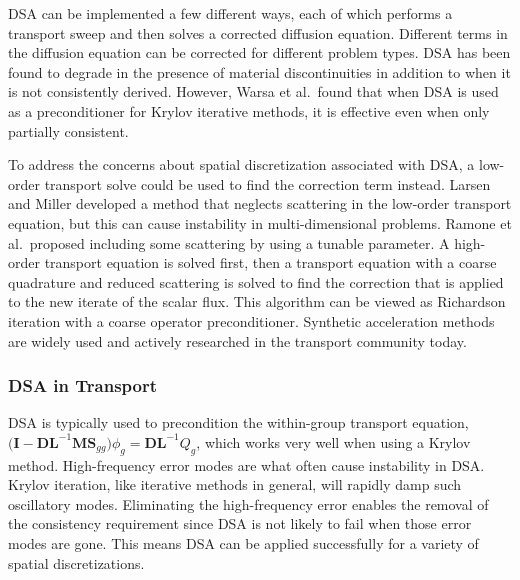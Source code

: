 \documentclass[12pt]{article}
\newcommand{\ve}[1]{\ensuremath{\mathbf{#1}}}
\begin{document}
DSA can be implemented a few different ways, each of which performs a transport sweep and then solves a corrected diffusion equation. Different terms in the diffusion equation can be corrected for different problem types. %
DSA has been found to degrade in the presence of material discontinuities in addition to when it is not consistently derived. However, Warsa et al.\ found that when DSA is used as a preconditioner for Krylov iterative methods, it is effective even when only partially consistent.%

To address the concerns about spatial discretization associated with DSA, a low-order transport solve could be used to find the correction term instead. Larsen and Miller developed a method that neglects scattering in the low-order transport equation, but this can cause instability in multi-dimensional problems. %
Ramone et al.\ proposed including some scattering by using a tunable parameter. A high-order transport equation is solved first, then a transport equation with a coarse quadrature and reduced scattering is solved to find the correction that is applied to the new iterate of the scalar flux. %
This algorithm can be viewed as Richardson iteration with a coarse operator preconditioner. Synthetic acceleration methods are widely used and actively researched in the transport community today. 

\subsubsection*{DSA in Transport}
DSA is typically used to precondition the within-group transport equation, $\bigl(\ve{I} - \ve{DL}^{-1}\ve{MS}_{gg}\bigr) \phi_{g} = \ve{DL}^{-1}Q_{g}$, which works very well when using a Krylov method. High-frequency error modes are what often cause instability in DSA. Krylov iteration, like iterative methods in general, will rapidly damp such oscillatory modes. Eliminating the high-frequency error enables the removal of the consistency requirement since DSA is not likely to fail when those error modes are gone. %
This means DSA can be applied successfully for a variety of spatial discretizations. 
\end{document}
